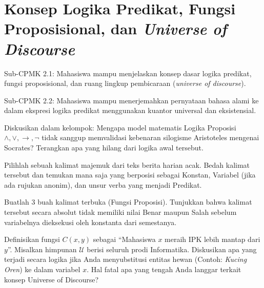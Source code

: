 \documentclass[../main]{subfiles}
\begin{document}
\chapter{Konsep Logika Predikat, Fungsi Proposisional, dan \textit{Universe of Discourse}}

\begin{subcpmk}
  \item Sub-CPMK 2.1: Mahasiswa mampu menjelaskan konsep dasar logika predikat, fungsi proposisional, dan ruang lingkup pembicaraan (\textit{universe of discourse}).
  \item Sub-CPMK 2.2: Mahasiswa mampu menerjemahkan pernyataan bahasa alami ke dalam ekspresi logika predikat menggunakan kuantor universal dan eksistensial.
\end{subcpmk}










\begin{aktivitas}
  \item Diskusikan dalam kelompok: Mengapa model matematis Logika Proposisi $\land, \lor, \rightarrow, \neg$ tidak sanggup memvalidasi kebenaran silogisme Aristoteles mengenai Socrates? Terangkan apa yang hilang dari logika awal tersebut.
  \item Pilihlah sebuah kalimat majemuk dari teks berita harian acak. Bedah kalimat tersebut dan temukan mana saja yang berposisi sebagai Konstan, Variabel (jika ada rujukan anonim), dan unsur verba yang menjadi Predikat.
  \item Buatlah 3 buah kalimat terbuka (Fungsi Proposisi). Tunjukkan bahwa kalimat tersebut secara absolut tidak memiliki nilai Benar maupun Salah sebelum variabelnya dieksekusi oleh konstanta dari semestanya.
  \item Definisikan fungsi $C(x, y)$ sebagai ``Mahasiswa $x$ meraih IPK lebih mantap dari $y$''. Misalkan himpunan $\mathcal{U}$ berisi seluruh prodi Informatika. Diskusikan apa yang terjadi secara logika jika Anda menyubstitusi entitas hewan (Contoh: \textit{Kucing Oren}) ke dalam variabel $x$. Hal fatal apa yang tengah Anda langgar terkait konsep Universe of Discourse?
\end{aktivitas}
\end{document}
